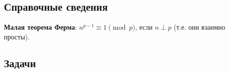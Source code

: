 \subsection*{Справочные сведения}

\textbf{Малая теорема Ферма}: $n^{p-1}\equiv 1\pmod p$, если $n\perp p$ (т.е. они взаимно просты).


\subsection*{Задачи}


